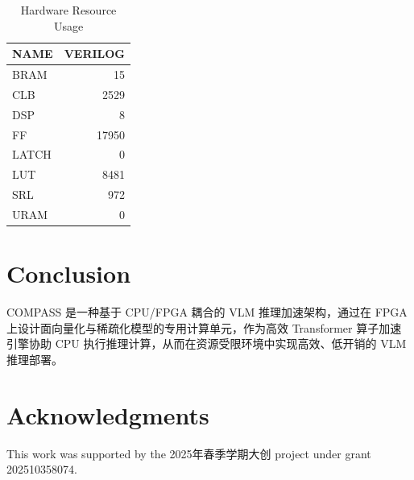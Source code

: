 \documentclass[sigconf]{acmart}
\begin{document}
	\begin{table}[htbp]
		\centering
		\caption{Hardware Resource Usage}
		\label{tab:resource_usage}
		\begin{tabular}{lr}
			\toprule
			\textbf{NAME} & \textbf{VERILOG} \\
			\midrule
			BRAM  & 15 \\
			CLB   & 2529 \\
			DSP   & 8 \\
			FF    & 17950 \\
			LATCH & 0 \\
			LUT   & 8481 \\
			SRL   & 972 \\
			URAM  & 0 \\
			\bottomrule
		\end{tabular}
	\end{table}
	
	\section{Conclusion}
	
	COMPASS 是一种基于 CPU/FPGA 耦合的 VLM 推理加速架构，通过在 FPGA 上设计面向量化与稀疏化模型的专用计算单元，作为高效 Transformer 算子加速引擎协助 CPU 执行推理计算，从而在资源受限环境中实现高效、低开销的 VLM 推理部署。
	
	\section{Acknowledgments}

	This work was supported by the 2025年春季学期大创 project under grant 202510358074.

	\begin{small}
		
		
	\end{small}
	
\end{document}
